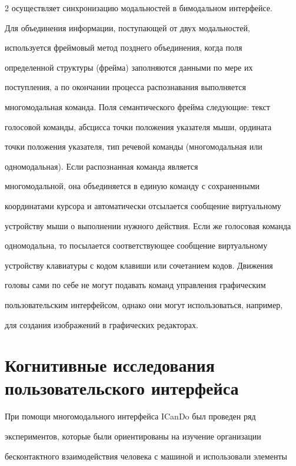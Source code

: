 \begin{multicols}{2}
осуществляет синхронизацию модальностей в бимодальном интерфейсе.


  


  Для объединения информации, поступающей от двух модальностей, 


используется фреймовый метод позднего объединения, когда поля 


определенной структуры (фрейма) заполняются данными по мере их 


поступления, а по окончании процесса распознавания выполняется 


многомодальная команда. Поля семантического фрейма следующие: текст 


голосовой команды, абсцисса точки положения указателя мыши, ордината 


точки положения указателя, тип речевой команды (многомодальная или 


одномодальная). Если распознанная команда является 


многомодальной, она объединяется в единую команду с сохраненными 


координатами курсора и автоматически отсылается сообщение виртуальному 


устройству мыши о выполнении нужного действия. Если же голосовая команда 


одномодальна, то посылается соответствующее сообщение виртуальному 


устройству клавиатуры с кодом клавиши или сочетанием кодов. Движения 


головы сами по себе не могут подавать команд управления графическим 


пользовательским интерфейсом, однако они могут использоваться, например, 


для создания изображений в графических редакторах.


  


\section{Когнитивные исследования пользовательского интерфейса}


  


  При помощи многомодального интерфейса ICanDo был проведен ряд 


экспериментов, которые были ориентированы на изучение организации 


бесконтактного взаимодействия человека с машиной и использовали элементы 



\end{multicols}
